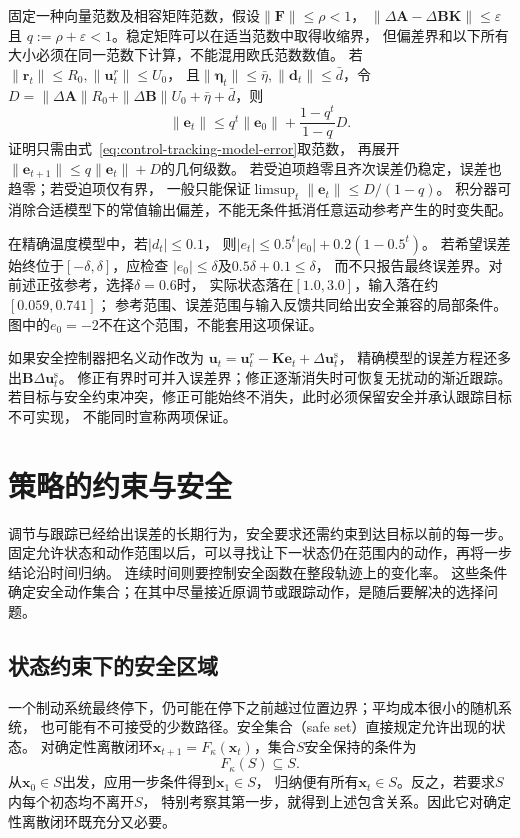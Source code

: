 固定一种向量范数及相容矩阵范数，假设$\|\bm F\|\leq\rho<1$，
$\|\Delta\bm A-\Delta\bm B\bm K\|\leq\varepsilon$且
$q:=\rho+\varepsilon<1$。稳定矩阵可以在适当范数中取得收缩界，
但偏差界和以下所有大小必须在同一范数下计算，不能混用欧氏范数数值。
若$\|\bm r_t\|\leq R_0,\|\bm u_t^r\|\leq U_0$，
且$\|\bm\eta_t\|\leq\bar\eta,\|\bm d_t\|\leq\bar d$，令
$D=\|\Delta\bm A\|R_0+\|\Delta\bm B\|U_0+\bar\eta+\bar d$，则
\begin{equation}
  \|\bm e_t\|\leq q^t\|\bm e_0\|
         +\frac{1-q^t}{1-q}D.
  \label{eq:control-tracking-error-bound}
\end{equation}
证明只需由式~\eqref{eq:control-tracking-model-error}取范数，
再展开$\|\bm e_{t+1}\|\leq q\|\bm e_t\|+D$的几何级数。
若受迫项趋零且齐次误差仍稳定，误差也趋零；若受迫项仅有界，
一般只能保证$\limsup_t\|\bm e_t\|\leq D/(1-q)$。
积分器可消除合适模型下的常值输出偏差，不能无条件抵消任意运动参考产生的时变失配。

在精确温度模型中，若$|d_t|\leq0.1$，
则$|e_t|\leq0.5^t|e_0|+0.2(1-0.5^t)$。
若希望误差始终位于$[-\delta,\delta]$，应检查
$|e_0|\leq\delta$及$0.5\delta+0.1\leq\delta$，
而不只报告最终误差界。对前述正弦参考，选择$\delta=0.6$时，
实际状态落在$[1.0,3.0]$，输入落在约$[0.059,0.741]$；
参考范围、误差范围与输入反馈共同给出安全兼容的局部条件。
图中的$e_0=-2$不在这个范围，不能套用这项保证。

如果安全控制器把名义动作改为
$\bm u_t=\bm u_t^r-\bm K\bm e_t+\Delta\bm u_t^{\mathrm s}$，
精确模型的误差方程还多出$\bm B\Delta\bm u_t^{\mathrm s}$。
修正有界时可并入误差界；修正逐渐消失时可恢复无扰动的渐近跟踪。
若目标与安全约束冲突，修正可能始终不消失，此时必须保留安全并承认跟踪目标不可实现，
不能同时宣称两项保证。

\section{策略的约束与安全}
\label{sec:control-safety-cbf}

调节与跟踪已经给出误差的长期行为，安全要求还需约束到达目标以前的每一步。
固定允许状态和动作范围以后，可以寻找让下一状态仍在范围内的动作，再将一步结论沿时间归纳。
连续时间则要控制安全函数在整段轨迹上的变化率。
这些条件确定安全动作集合；在其中尽量接近原调节或跟踪动作，是随后要解决的选择问题。

\subsection{状态约束下的安全区域}
一个制动系统最终停下，仍可能在停下之前越过位置边界；平均成本很小的随机系统，
也可能有不可接受的少数路径。安全集合（safe set）直接规定允许出现的状态。
对确定性离散闭环$\bm x_{t+1}=F_\kappa(\bm x_t)$，集合$S$安全保持的条件为
\begin{equation}
  F_\kappa(S)\subseteq S.
  \label{eq:control-discrete-invariance}
\end{equation}
从$\bm x_0\in S$出发，应用一步条件得到$\bm x_1\in S$，
归纳便有所有$\bm x_t\in S$。反之，若要求$S$内每个初态均不离开$S$，
特别考察其第一步，就得到上述包含关系。因此它对确定性离散闭环既充分又必要。


